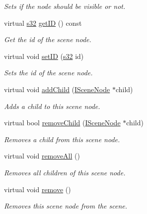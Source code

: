 \begin{DoxyCompactItemize}
\begin{DoxyCompactList}\small\item\em Sets if the node should be visible or not. \end{DoxyCompactList}\item 
virtual \hyperlink{namespaceirr_ac66849b7a6ed16e30ebede579f9b47c6}{s32} \hyperlink{classirr_1_1scene_1_1ISceneNode_a1a3b5b32f54bc1b6617756fc48a2cb17}{get\+ID} () const
\begin{DoxyCompactList}\small\item\em Get the id of the scene node. \end{DoxyCompactList}\item 
virtual void \hyperlink{classirr_1_1scene_1_1ISceneNode_ade60c630c4768200b1d15debbd00fe0e}{set\+ID} (\hyperlink{namespaceirr_ac66849b7a6ed16e30ebede579f9b47c6}{s32} id)
\begin{DoxyCompactList}\small\item\em Sets the id of the scene node. \end{DoxyCompactList}\item 
virtual void \hyperlink{classirr_1_1scene_1_1ISceneNode_acceef4fbb68f6cc7bb40035225350970}{add\+Child} (\hyperlink{classirr_1_1scene_1_1ISceneNode}{I\+Scene\+Node} $\ast$child)
\begin{DoxyCompactList}\small\item\em Adds a child to this scene node. \end{DoxyCompactList}\item 
virtual bool \hyperlink{classirr_1_1scene_1_1ISceneNode_a831e371142fc883c7dd229552e0340de}{remove\+Child} (\hyperlink{classirr_1_1scene_1_1ISceneNode}{I\+Scene\+Node} $\ast$child)
\begin{DoxyCompactList}\small\item\em Removes a child from this scene node. \end{DoxyCompactList}\item 
virtual void \hyperlink{classirr_1_1scene_1_1ISceneNode_a348767bb5b9262d997067c50e079e5be}{remove\+All} ()
\begin{DoxyCompactList}\small\item\em Removes all children of this scene node. \end{DoxyCompactList}\item 
virtual void \hyperlink{classirr_1_1scene_1_1ISceneNode_a2efa2670e29d6bb33b0dd99403b8b69c}{remove} ()
\begin{DoxyCompactList}\small\item\em Removes this scene node from the scene. \end{DoxyCompactList}\item 

\end{DoxyCompactItemize}
